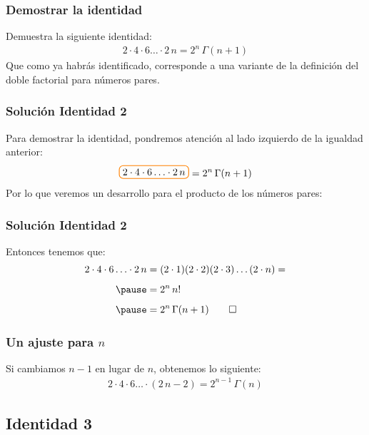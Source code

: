 \documentclass[12pt]{beamer}
\begin{document}
\begin{frame}
\frametitle{Demostrar la identidad}
Demuestra la siguiente identidad:
\pause
\begin{align*}
2 \cdot 4 \cdot 6 \ldots \cdot 2 \, n = 2^{n} \, \Gamma (n + 1)
\end{align*}
\pause
Que como ya habrás identificado, corresponde a una variante de la definición del doble factorial para números pares.
\end{frame}
\begin{frame}[t]
\frametitle{Solución Identidad 2}
Para demostrar la identidad, pondremos atención al lado izquierdo de la igualdad anterior:
\pause
\begin{align*}
\boxedcolor{2 \cdot 4 \cdot 6 \ldots \cdot 2 \, n } = 2^{n} \, \Gamma (n + 1)
\end{align*}
\pause
Por lo que veremos un desarrollo para el producto de los números pares:
\end{frame}
\begin{frame}
\frametitle{Solución Identidad 2}
Entonces tenemos que:
\pause
\begin{eqnarray}
\begin{aligned}
2 \cdot 4 \cdot 6 \ldots \cdot 2 \, n  &= (2 \cdot 1) (2 \cdot 2) (2 \cdot 3) \ldots (2 \cdot n) = \\[0.5em] \pause
&= 2^{n} \, n! \nonumber \\[0.5em] \pause
&= 2^{n} \, \Gamma (n + 1) \qed 
\end{aligned}
\label{eq:ecuacion_01_16}
\end{eqnarray}
\end{frame}
\begin{frame}
\frametitle{Un ajuste para $n$}
Si cambiamos $n - 1$ en lugar de $n$, obtenemos lo siguiente:
\pause
\begin{align*}
2 \cdot 4 \cdot 6 \ldots \cdot (2 \, n - 2)  = 2^{n-1} \, \Gamma (n)
\end{align*}
\end{frame}

\subsection{Identidad 3}
\end{document}
